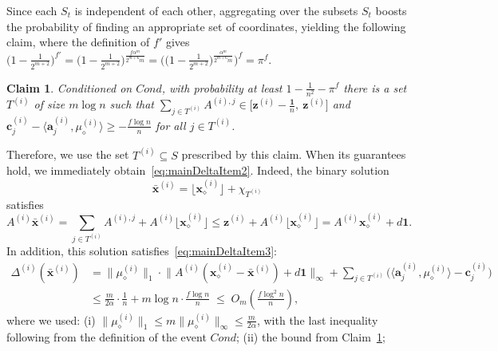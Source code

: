 \documentclass{article}
\newcommand{\red}[1]{{\color{red} #1}}
\newcommand{\ip}{\iprods}
\newcommand{\av}[0]{\mathbf{a}}
\newcommand{\cv}[0]{\mathbf{c}}
\newcommand{\xv}[0]{\mathbf{x}}
\newcommand{\zv}[0]{\mathbf{z}}
\newcommand{\ones}{{\bm{1}}}
\newcommand{\normm}[1]{\big\lVert#1\big\rVert}
\newcommand{\iprods}[2]{\langle {#1}, {#2} \rangle}
\newcommand{\colij}{\av^{(i)}_j}
\newtheorem{claim}[thm]{Claim}
\begin{document}

Since each $S_t$ is independent of each other,  
aggregating over the subsets $S_t$ boosts the probability of
finding an appropriate set of coordinates, yielding the following claim, 
where the definition of $f'$ gives $ \big(1 - \frac{1}{2^{m+2}}\big)^{f'} = \big(1 - \frac{1}{2^{m+2}}\big)^{\frac{f\alpha^m}{2^{m+6}m}} = \big(\big(1 - \frac{1}{2^{m+2}}\big)^{\frac{\alpha^m}{2^{m+6}m}}\big)^f = \pi^{f}$. 

\begin{claim} \label{claim:useDiscrepancy2}
    Conditioned on $Cond$, with probability at least $1 - {\frac{1}{n^2}-\pi^f}$ there is a set $T^{(i)}$ of size $m \log n$ such that $\sum_{j \in T^{(i)}} A^{(i),j} \in \big[\zv^{(i)} - \frac{\ones}{n},~\zv^{(i)}\big]$ and $\cv^{(i)}_j - \ip{\colij}{\mu^{(i)}_\diamond} \ge - \frac{f \log n}{n}$ for all $j \in T^{(i)}$.
\end{claim}

Therefore, we use the set $T^{(i)} \subseteq S$ prescribed by this claim.
When its guarantees hold, we immediately obtain~\eqref{eq:mainDeltaItem2}.
Indeed, the binary solution
\[
\bar{\xv}^{(i)} = \lfloor \xv^{(i)}_{\diamond} \rfloor + \chi_{T^{(i)}}
\]
satisfies
\[
A^{(i)} \bar{\xv}^{(i)}
= \sum_{j \in T^{(i)}} A^{(i),j}
  + A^{(i)} \lfloor \xv^{(i)}_{\diamond} \rfloor
\le \zv^{(i)} + A^{(i)} \lfloor \xv^{(i)}_{\diamond} \rfloor
= A^{(i)} \xv^{(i)}_{\diamond} + d \ones .
\]
In addition, this solution satisfies~\eqref{eq:mainDeltaItem3}:
%
\begin{align*}
\Delta^{(i)}(\bar{\xv}^{(i)})
&=
\normm{\mu^{(i)}_\diamond}_1 \cdot
\normm{A^{(i)} (\xv^{(i)}_\diamond - \bar{\xv}^{(i)}) + d \ones}_{\infty}
+ \sum_{j \in T^{(i)}}
\Big( \ip{\colij}{\mu^{(i)}_\diamond} - \cv^{(i)}_j \Big) \\
&\le
\frac{m}{2\alpha} \cdot \frac{1}{n}
+ m \log n \cdot \frac{f \log n}{n}
\;\le\;
O_m\!\left(\frac{f \log^2 n}{n}\right),
\end{align*}
where we used:
(i) $\normm{\mu^{(i)}_\diamond}_1 \le m \normm{\mu^{(i)}_\diamond}_\infty
\le \frac{m}{2\alpha}$, with the last inequality following from the definition
of the event $Cond$;
(ii) the bound from Claim~\ref{claim:useDiscrepancy2};
\end{document}
